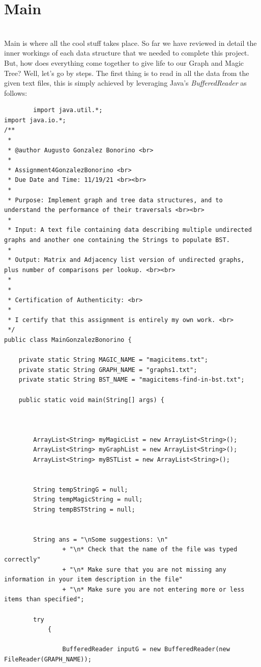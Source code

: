 \documentclass[letterpaper, 10pt]{article}
\begin{document}
\section{Main}
\\
Main is where all the cool stuff takes place. So far we have reviewed in detail the inner workings of each data structure that we needed to complete this project. But, how does everything come together to give life to our Graph and Magic Tree? Well, let's go by steps. The first thing is to read in all the data from the given text files, this is simply achieved by leveraging Java's \textit{BufferedReader} as follows:
\\
\begin{lstlisting}
        import java.util.*;
import java.io.*;
/**
 * 
 * @author Augusto Gonzalez Bonorino <br>
 * 
 * Assignment4GonzalezBonorino <br>
 * Due Date and Time: 11/19/21 <br><br>
 *
 * Purpose: Implement graph and tree data structures, and to understand the performance of their traversals <br><br>
 *			
 * Input: A text file containing data describing multiple undirected graphs and another one containing the Strings to populate BST.
 * 		  
 * Output: Matrix and Adjacency list version of undirected graphs, plus number of comparisons per lookup. <br><br>
 *		   
 *
 * Certification of Authenticity: <br>
 * 
 * I certify that this assignment is entirely my own work. <br>
 */
public class MainGonzalezBonorino {
	
	private static String MAGIC_NAME = "magicitems.txt";
	private static String GRAPH_NAME = "graphs1.txt";
	private static String BST_NAME = "magicitems-find-in-bst.txt";
	
	public static void main(String[] args) {
		
		

		ArrayList<String> myMagicList = new ArrayList<String>();
		ArrayList<String> myGraphList = new ArrayList<String>();
		ArrayList<String> myBSTList = new ArrayList<String>();
		
		
		String tempStringG = null;
		String tempMagicString = null;
		String tempBSTString = null;

		
		String ans = "\nSome suggestions: \n"
				+ "\n* Check that the name of the file was typed correctly"
				+ "\n* Make sure that you are not missing any information in your item description in the file"
				+ "\n* Make sure you are not entering more or less items than specified";
		
		try
			{
				
				BufferedReader inputG = new BufferedReader(new FileReader(GRAPH_NAME));
				

\end{lstlisting}
\end{document}
